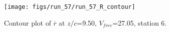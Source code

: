 \begin{figure}[H]
\centering
\texttt{[image: figs/run\_57/run\_57\_R\_contour]}
\caption{Contour plot of $\overline{r}$ at $z/c$=9.50, $V_{free}$=27.05, station 6.}
\label{fig:run_57_R_contour}
\end{figure}


